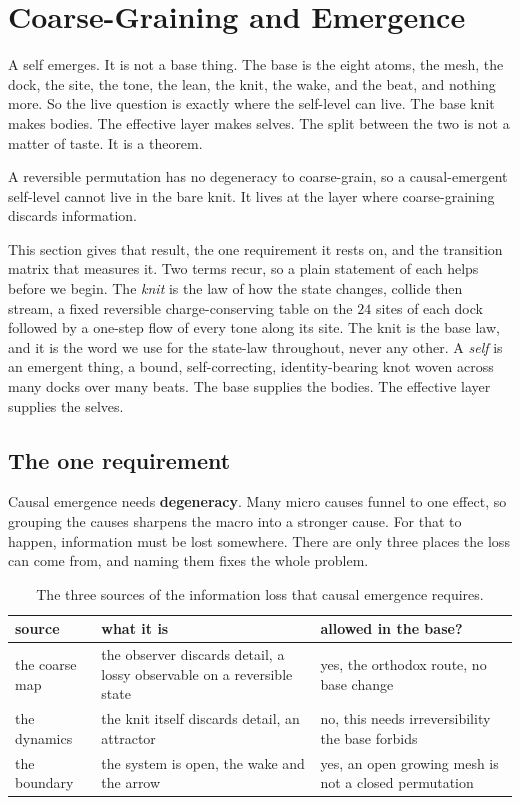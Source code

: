 \section{Coarse-Graining and Emergence}

A self emerges. It is not a base thing. The base is the eight atoms, the mesh, the dock, the site, the tone, the lean, the knit, the wake, and the beat, and nothing more. So the live question is exactly where the self-level can live. The base knit makes bodies. The effective layer makes selves. The split between the two is not a matter of taste. It is a theorem.

\begin{principle}
A reversible permutation has no degeneracy to coarse-grain, so a causal-emergent self-level cannot live in the bare knit. It lives at the layer where coarse-graining discards information.
\end{principle}

This section gives that result, the one requirement it rests on, and the transition matrix that measures it. Two terms recur, so a plain statement of each helps before we begin. The \emph{knit} is the law of how the state changes, collide then stream, a fixed reversible charge-conserving table on the $24$ sites of each dock followed by a one-step flow of every tone along its site. The knit is the base law, and it is the word we use for the state-law throughout, never any other. A \emph{self} is an emergent thing, a bound, self-correcting, identity-bearing knot woven across many docks over many beats. The base supplies the bodies. The effective layer supplies the selves.

\subsection{The one requirement}

Causal emergence needs \textbf{degeneracy}. Many micro causes funnel to one effect, so grouping the causes sharpens the macro into a stronger cause. For that to happen, information must be lost somewhere. There are only three places the loss can come from, and naming them fixes the whole problem.

\begin{table}[ht]
\centering
\begin{tabular}{@{}lll@{}}
\toprule
source & what it is & allowed in the base? \\
\midrule
the coarse map & the observer discards detail, a lossy observable on a reversible state & yes, the orthodox route, no base change \\
the dynamics & the knit itself discards detail, an attractor & no, this needs irreversibility the base forbids \\
the boundary & the system is open, the wake and the arrow & yes, an open growing mesh is not a closed permutation \\
\bottomrule
\end{tabular}
\caption{The three sources of the information loss that causal emergence requires.}
\label{tab:loss-sources}
\end{table}

